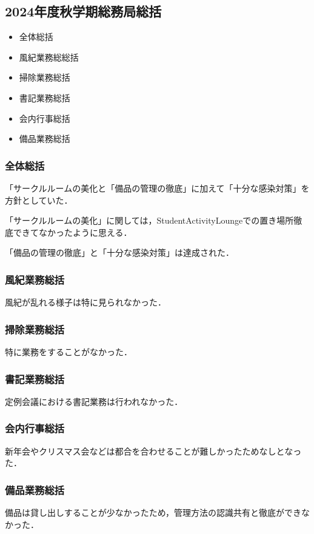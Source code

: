 \subsection*{2024年度秋学期総務局総括}


\begin{itemize}
    \item 全体総括
    \item 風紀業務総総括
    \item 掃除業務総括
    \item 書記業務総括
    \item 会内行事総括
    \item 備品業務総括
\end{itemize}

\subsubsection*{全体総括}

「サークルルームの美化と「備品の管理の徹底」に加えて「十分な感染対策」を方針としていた．

「サークルルームの美化」に関しては，StudentActivityLoungeでの置き場所徹底できてなかったように思える．

「備品の管理の徹底」と「十分な感染対策」は達成された．

\subsubsection*{風紀業務総括}

風紀が乱れる様子は特に見られなかった．

\subsubsection*{掃除業務総括}

特に業務をすることがなかった．

\subsubsection*{書記業務総括}

定例会議における書記業務は行われなかった．

\subsubsection*{会内行事総括}

新年会やクリスマス会などは都合を合わせることが難しかったためなしとなった．

\subsubsection*{備品業務総括}
備品は貸し出しすることが少なかったため，管理方法の認識共有と徹底ができなかった．

